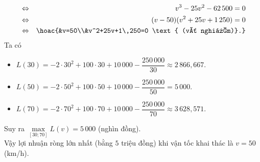 \begin{ex}
{\begin{eqnarray*}
			&\Leftrightarrow &v^3-25v^2-62\,500=0\\
			&\Leftrightarrow &(v-50)(v^2+25v+1\,250)=0\\
			&\Leftrightarrow &\hoac{&v=50\\&v^2+25v+1\,250=0 \text{ (vô nghiệm)}.}
		\end{eqnarray*}
		Ta có
		\begin{itemize}
			\item $L(30)=-2\cdot 30^2+100\cdot30+10\,000-\dfrac{250\,000}{30} \approx 2\,866{,}667$.
			\item $L(50)=-2\cdot 50^2+100\cdot50+10\,000-\dfrac{250\,000}{50}=5\,000$.
			\item $L(70)=-2\cdot 70^2+100\cdot70+10\,000-\dfrac{250\,000}{70} \approx 3\,628{,}571$.
		\end{itemize}
		Suy ra $\max\limits_{[30;70]}L(v)=5\,000$ (nghìn đồng).\\
		Vậy lợi nhuận ròng lớn nhất (bằng $5$ triệu đồng) khi vận tốc khai thác là $v=50$ (km/h).
	}
\end{ex}

